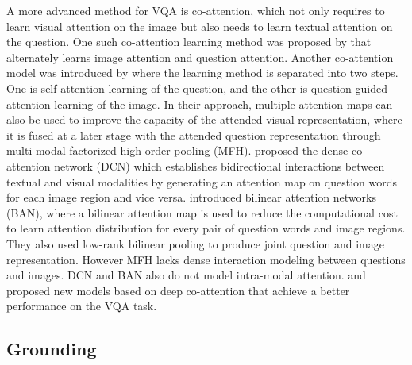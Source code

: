 \documentclass{article}
\begin{document}
A more advanced method for VQA is co-attention, which not only requires to learn visual attention on the image but also needs to learn textual attention on the question. One such co-attention learning method was proposed by \citet{lu2016hierarchical} that alternately learns image attention and question attention. 
Another co-attention model was introduced by \citet{yu2018beyond} where the learning method is separated into two steps. One is self-attention learning of the question, and the other is question-guided-attention learning of the image. In their approach, multiple attention maps can also be used to improve the capacity of the attended visual representation, where it is fused at a later stage with the attended question representation through multi-modal factorized high-order pooling (MFH).
\citet{Nguyen_2018_CVPR} proposed the dense co-attention network (DCN) which establishes bidirectional interactions between textual and visual modalities by generating an attention map on question words for each image region and vice versa. \citet{ban} introduced bilinear attention networks (BAN), where a bilinear attention map is used to reduce the computational cost to learn attention distribution for every pair of question words and image regions. They also used low-rank bilinear pooling to produce joint question and image representation. However MFH lacks dense interaction modeling between questions and images. DCN and BAN also do not model intra-modal attention. \citet{gao2019dynamic} and \citet{yu2019mcan} proposed new models based on deep co-attention that achieve a better performance on the VQA task. %

\subsection{Grounding}
\end{document}
